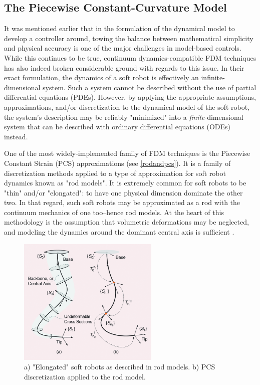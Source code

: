 \subsection{The Piecewise Constant-Curvature Model}
It was mentioned earlier that in the formulation of the dynamical model to develop a controller around, towing the balance between mathematical simplicity and physical accuracy is one of the major challenges in model-based controls. While this continues to be true, continuum dynamics-compatible FDM techniques has also indeed broken considerable ground with regards to this issue. In their exact formulation, the dynamics of a soft robot is effectively an infinite-dimensional system. Such a system cannot be described without the use of partial differential equations (PDEs). However, by applying the appropriate assumptions, approximations, and/or discretization to the dynamical model of the soft robot, the system's description may be reliably "minimized" into a \textit{finite}-dimensional system that can be described with ordinary differential equations (ODEs) instead.

One of the most widely-implemented family of FDM techniques is the Piecewise Constant Strain (PCS) approximations (see \autoref{rodandpcs}). It is a family of discretization methods applied to a type of approximation for soft robot dynamics known as "rod models". It is extremely common for soft robots to be "thin" and/or "elongated": to have one physical dimension dominate the other two. In that regard, such soft robots may be approximated as a rod with the continuum mechanics of one too--hence rod models. At the heart of this methodology is the assumption that volumetric deformations may be neglected, and modeling the dynamics around the dominant central axis is sufficient \cite{della_santina_model-based_2023}.

\begin{figure}[h!]
    \centering
    \includegraphics[width=0.6\textwidth]{graphics/roddiagram.png}
    \caption{a) "Elongated" soft robots as described in rod models. b) PCS discretization applied to the rod model. }
    \label{rodandpcs}
\end{figure}


